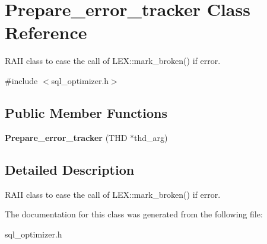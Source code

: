 \hypertarget{classPrepare__error__tracker}{}\section{Prepare\+\_\+error\+\_\+tracker Class Reference}
\label{classPrepare__error__tracker}


R\+A\+II class to ease the call of L\+E\+X\+::mark\+\_\+broken() if error.  




{\ttfamily \#include $<$sql\+\_\+optimizer.\+h$>$}

\subsection*{Public Member Functions}
\begin{DoxyCompactItemize}
\item 
\mbox{\label{classPrepare__error__tracker_adc4bffb6ef68f12e0fff0ead0c38a24f}} 
{\bfseries Prepare\+\_\+error\+\_\+tracker} (T\+HD $\ast$thd\+\_\+arg)
\end{DoxyCompactItemize}


\subsection{Detailed Description}
R\+A\+II class to ease the call of L\+E\+X\+::mark\+\_\+broken() if error. 

The documentation for this class was generated from the following file\+:\begin{DoxyCompactItemize}
\item 
sql\+\_\+optimizer.\+h\end{DoxyCompactItemize}
